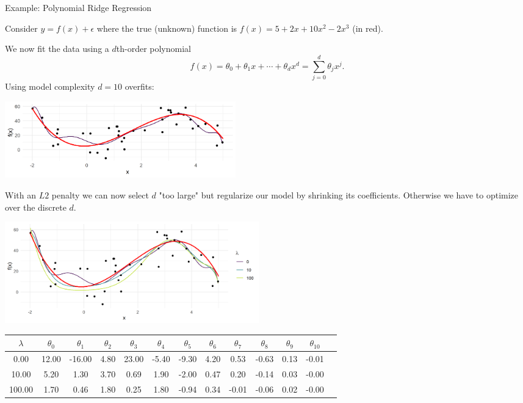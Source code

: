 \documentclass[11pt,compress,t,notes=noshow, xcolor=table]{beamer}
\begin{document}
\begin{vbframe}{Example: Polynomial Ridge Regression}

Consider $y=f(x)+\epsilon$ where the true (unknown) function is \(f(x) = 5 + 2x +10x^2 - 2x^3\) (in red).

\lz

We now fit the data using a \(d\)th-order polynomial
\[ f(x) = \theta_0 + \theta_1 x + \cdots + \theta_d x^d = \sum_{j = 0}^{d} \theta_j x^j\text{.} \]
Using model complexity $d = 10$ overfits:

\begin{center}
\includegraphics[width = 10cm ]{figure/poly_ridge_1.png} \\
\end{center}

\framebreak

With an $L2$ penalty we can now select $d$ "too large" but regularize our model by shrinking its coefficients. Otherwise we have to optimize over the discrete $d$.

\vfill

\begin{center}
\includegraphics[width = 11cm ]{figure/poly_ridge_2.png} \\
\end{center}


\begin{center}
\tiny
\begin{tabular}{ c| c c c c c c c c c c c c}
 $\lambda$ & $\theta_0$ & $\theta_1$ & $\theta_2$ & $\theta_3$ & $\theta_4$ & $\theta_5$ & $\theta_6$ & $\theta_7$ & $\theta_8$ & $\theta_9$ & $\theta_{10}$ \\ 
 \hline
 0.00 & 12.00 & -16.00 & 4.80 & 23.00 & -5.40 & -9.30 & 4.20 & 0.53 & -0.63 & 0.13 & -0.01 \\  
 10.00 & 5.20 &1.30 & 3.70 & 0.69 & 1.90 & -2.00 & 0.47 & 0.20 & -0.14 & 0.03 & -0.00 \\ 
 100.00 & 1.70 & 0.46 & 1.80 & 0.25 & 1.80 & -0.94 & 0.34 & -0.01 & -0.06 & 0.02 & -0.00
\end{tabular}
\end{center}


\end{vbframe}
\end{document}
